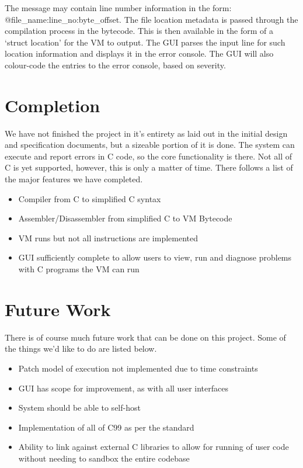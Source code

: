 \documentclass[10pt,a4paper]{report}
\begin{document}
The message may contain line number information in the form: @file\_name:line\_no:byte\_offset. The file location metadata is passed through the compilation process in the bytecode. This is then available in the form of a `struct location' for the VM to output. The GUI parses the input line for such location information and displays it in the error console. The GUI will also colour-code the entries to the error console, based on severity.

\section{Completion}
We have not finished the project in it's entirety as laid out in the initial design and specification documents, but a sizeable portion of it is done. The system can execute and report errors in C code, so the core functionality is there. Not all of C is yet supported, however, this is only a matter of time. There follows a list of the major features we have completed.
\begin{itemize}
\item Compiler from C to simplified C syntax
\item Assembler/Disassembler from simplified C to VM Bytecode
\item VM runs but not all instructions are implemented
\item GUI sufficiently complete to allow users to view, run and diagnose problems with C programs the VM can run
\end{itemize}

\section{Future Work}
There is of course much future work that can be done on this project. Some of the things we'd like to do are listed below.
\begin{itemize}
\item Patch model of execution not implemented due to time constraints
\item GUI has scope for improvement, as with all user interfaces
\item System should be able to self-host
\item Implementation of all of C99 as per the standard
\item Ability to link against external C libraries to allow for running of user code without needing to sandbox the entire codebase
\end{itemize}
\end{document}
